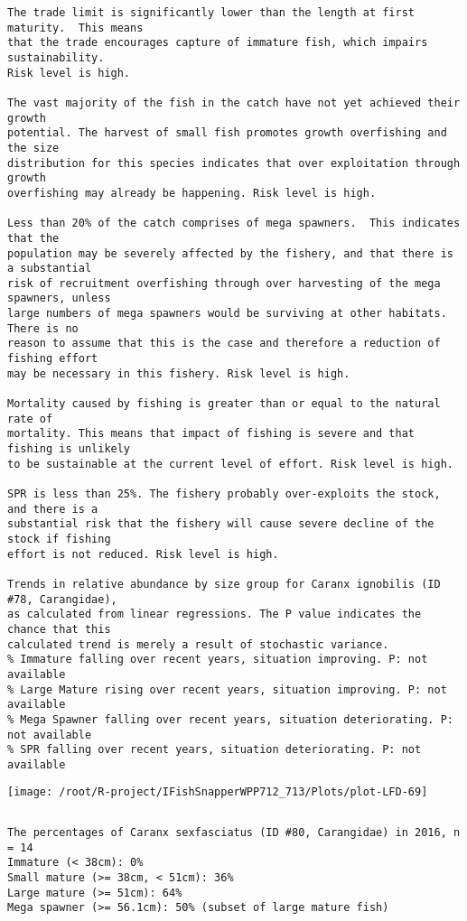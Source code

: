 \documentclass{report}\usepackage[]{graphicx}\usepackage[]{color}
\makeatletter
\def\maxwidth{ %
  \ifdim\Gin@nat@width>\linewidth
    \linewidth
  \else
    \Gin@nat@width
  \fi
}
\newenvironment{kframe}{%
 \def\at@end@of@kframe{}%
 \ifinner\ifhmode%
  \def\at@end@of@kframe{\end{minipage}}%
  \begin{minipage}{\columnwidth}%
 \fi\fi%
 \def\FrameCommand##1{\hskip\@totalleftmargin \hskip-\fboxsep
 \colorbox{shadecolor}{##1}\hskip-\fboxsep
     \hskip-\linewidth \hskip-\@totalleftmargin \hskip\columnwidth}%
 \MakeFramed {\advance\hsize-\width
   \@totalleftmargin\z@ \linewidth\hsize
   \@setminipage}}%
 {\par\unskip\endMakeFramed%
 \at@end@of@kframe}
\newenvironment{knitrout}{}{} %
\makeatother
\begin{document}
\begin{knitrout}
\begin{kframe}
\begin{verbatim}
The trade limit is significantly lower than the length at first maturity.  This means
that the trade encourages capture of immature fish, which impairs sustainability.
Risk level is high.

The vast majority of the fish in the catch have not yet achieved their growth
potential. The harvest of small fish promotes growth overfishing and the size
distribution for this species indicates that over exploitation through growth
overfishing may already be happening. Risk level is high.

Less than 20% of the catch comprises of mega spawners.  This indicates that the
population may be severely affected by the fishery, and that there is a substantial
risk of recruitment overfishing through over harvesting of the mega spawners, unless
large numbers of mega spawners would be surviving at other habitats. There is no
reason to assume that this is the case and therefore a reduction of fishing effort
may be necessary in this fishery. Risk level is high.
 
Mortality caused by fishing is greater than or equal to the natural rate of
mortality. This means that impact of fishing is severe and that fishing is unlikely
to be sustainable at the current level of effort. Risk level is high.
 
SPR is less than 25%. The fishery probably over-exploits the stock, and there is a
substantial risk that the fishery will cause severe decline of the stock if fishing
effort is not reduced. Risk level is high.
 
Trends in relative abundance by size group for Caranx ignobilis (ID #78, Carangidae),
as calculated from linear regressions. The P value indicates the chance that this
calculated trend is merely a result of stochastic variance.
% Immature falling over recent years, situation improving. P: not available
% Large Mature rising over recent years, situation improving. P: not available
% Mega Spawner falling over recent years, situation deteriorating. P: not available
% SPR falling over recent years, situation deteriorating. P: not available
\end{verbatim}
\end{kframe}
\texttt{[image: /root/R-project/IFishSnapperWPP712\_713/Plots/plot-LFD-69]} 
\begin{kframe}\begin{verbatim}
\end{verbatim}
\end{kframe}
\clearpage
\newpage
\begin{kframe}\begin{verbatim}
The percentages of Caranx sexfasciatus (ID #80, Carangidae) in 2016, n = 14
Immature (< 38cm): 0%
Small mature (>= 38cm, < 51cm): 36%
Large mature (>= 51cm): 64%
Mega spawner (>= 56.1cm): 50% (subset of large mature fish)
 

\end{verbatim}
\end{kframe}
\end{knitrout}
\end{document}
